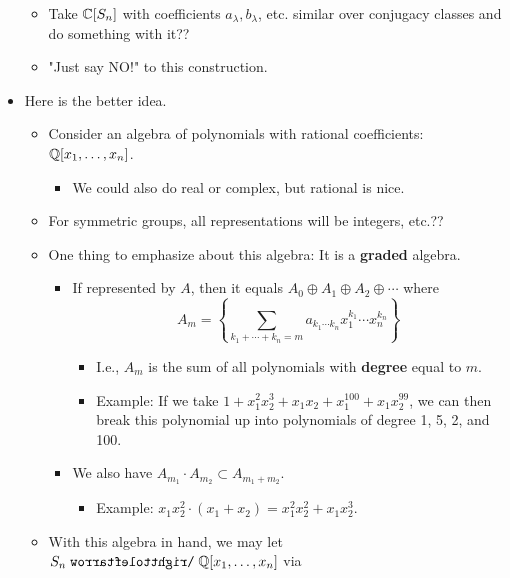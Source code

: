 \documentclass[../notes.tex]{subfiles}
\begin{document}
\begin{itemize}
\begin{itemize}
        \item Take $\mathbb{C}[S_n]$ with coefficients $a_\lambda,b_\lambda$, etc. similar over conjugacy classes and do something with it??
        \item "Just say NO!" to this construction.
    \end{itemize}
    \item Here is the better idea.
    \begin{itemize}
        \item Consider an algebra of polynomials with rational coefficients: $\mathbb{Q}[x_1,\dots,x_n]$.
        \begin{itemize}
            \item We could also do real or complex, but rational is nice.
        \end{itemize}
        \item For symmetric groups, all representations will be integers, etc.??
        \item One thing to emphasize about this algebra: It is a \textbf{graded} algebra.
        \begin{itemize}
            \item If represented by $A$, then it equals $A_0\oplus A_1\oplus A_2\oplus\cdots$ where
            \begin{equation*}
                A_m = \left\{ \sum_{k_1+\cdots+k_n=m}a_{k_1\cdots k_n}x_1^{k_1}\cdots x_n^{k_n} \right\}
            \end{equation*}
            \begin{itemize}
                \item I.e., $A_m$ is the sum of all polynomials with \textbf{degree} equal to $m$.
                \item Example: If we take $1+x_1^2x_2^3+x_1x_2+x_1^{100}+x_1x_2^{99}$, we can then break this polynomial up into polynomials of degree 1, 5, 2, and 100.
            \end{itemize}
            \item We also have $A_{m_1}\cdot A_{m_2}\subset A_{m_1+m_2}$.
            \begin{itemize}
                \item Example: $x_1x_2^2\cdot(x_1+x_2)=x_1^2x_2^2+x_1x_2^3$.
            \end{itemize}
        \end{itemize}
        \item With this algebra in hand, we may let $S_n\acts\Q[x_1,\dots,x_n]$ via
        \begin{equation*}

\end{equation*}
\end{itemize}
\end{itemize}
\end{document}
